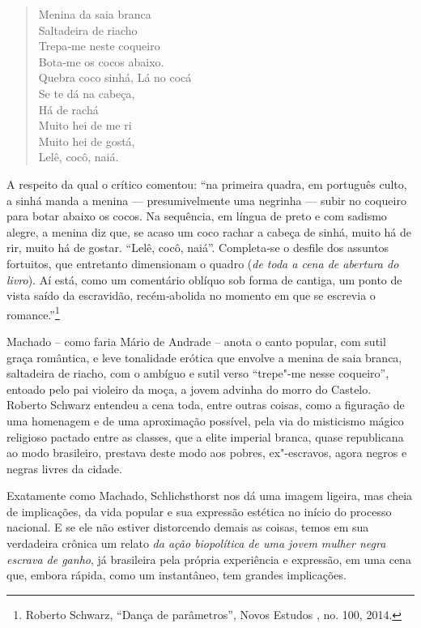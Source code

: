 \begin{verse}
Menina da saia branca\\
Saltadeira de riacho\\
Trepa‑me neste coqueiro\\
Bota‑me os cocos abaixo.\\[5pt]
Quebra coco sinhá, Lá no cocá\\
Se te dá na cabeça,\\
Há de rachá\\[5pt]
Muito hei de me ri\\
Muito hei de gostá,\\
Lelê, cocô, naiá.
\end{verse}

A respeito da qual o crítico comentou: ``na primeira quadra, em
português culto, a sinhá manda a menina --- presumivelmente uma negrinha
--- subir no coqueiro para botar abaixo os cocos. Na sequência, em
língua de preto e com sadismo alegre, a menina diz que, se acaso um coco
rachar a cabeça de sinhá, muito há de rir, muito há de gostar. ``Lelê,
cocô, naiá''. Completa‑se o desfile dos assuntos fortuitos, que
entretanto dimensionam o quadro (\emph{de toda a cena de abertura do
livro}). Aí está, como um comentário oblíquo sob forma de cantiga, um
ponto de vista saído da escravidão, recém‑abolida no momento em que se
escrevia o romance.''\footnote{Roberto Schwarz, ``Dança de parâmetros'',
  Novos Estudos , no. 100, 2014.}

Machado -- como faria Mário de Andrade -- anota o canto popular, com
sutil graça romântica, e leve tonalidade erótica que envolve a menina de
saia branca, saltadeira de riacho, com o ambíguo e sutil verso
``trepe"-me nesse coqueiro'', entoado pelo pai violeiro da moça, a jovem
advinha do morro do Castelo. Roberto Schwarz entendeu a cena toda, entre
outras coisas, como a figuração de uma homenagem e de uma aproximação
possível, pela via do misticismo mágico religioso pactado entre as
classes, que a elite imperial branca, quase republicana ao modo
brasileiro, prestava deste modo aos pobres, ex"-escravos, agora negros e
negras livres da cidade.

Exatamente como Machado, Schlichsthorst nos dá uma imagem ligeira, mas
cheia de implicações, da vida popular e sua expressão estética no início
do processo nacional. E se ele não estiver distorcendo demais as coisas,
temos em sua verdadeira crônica um relato \emph{da ação biopolítica de
uma jovem mulher negra escrava de ganho}, já brasileira pela própria
experiência e expressão, em uma cena que, embora rápida, como um
instantâneo, tem grandes implicações.

